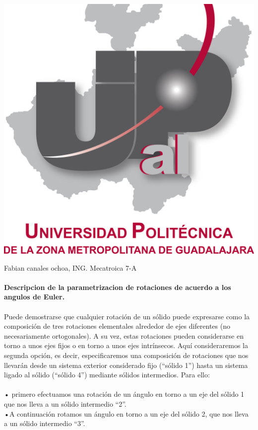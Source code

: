 \documentclass[10pt,a4paper]{article}
\begin{document}
\begin{center}
\includegraphics[scale=0.2]{imagenes/upzmg.png} 
\end{center}
\large \huge Fabian canales ochoa, ING. Mecatroica 7-A \\ \\
\large \huge \textbf{Descripcion de la parametrizacion de rotaciones de acuerdo a los angulos de Euler.
} \\ \\
\Large  Puede demostrarse que cualquier rotación de un sólido puede expresarse como la composición de tres rotaciones elementales alrededor de ejes diferentes (no necesariamente ortogonales). A su vez, estas rotaciones pueden considerarse en torno a unos ejes fijos o en torno a unos ejes intrínsecos. Aquí consideraremos la segunda opción, es decir, especificaremos una composición de rotaciones que nos llevarán desde un sistema exterior considerado fijo (“sólido 1”) hasta un sistema ligado al sólido (“sólido 4”) mediante sólidos intermedios. Para ello: \\ \\
• primero efectuamos una rotación de un ángulo en torno a un eje del sólido 1 que nos lleva a un sólido intermedio “2”.\\
  •A continuación rotamos un ángulo  en torno a un eje del sólido 2, que nos lleva a un sólido intermedio “3”.\\
\end{document}
